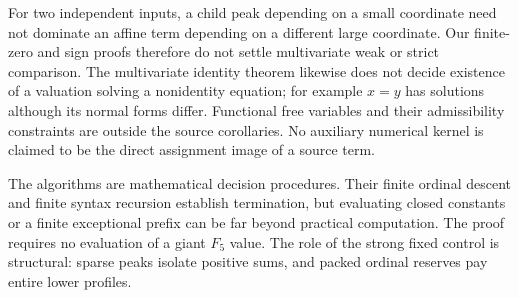 \documentclass[11pt,a4paper]{article}
\begin{document}
For two independent inputs, a child peak depending on a small coordinate
need not dominate an affine term depending on a different large coordinate.
Our finite-zero and sign proofs therefore do not settle multivariate
weak or strict comparison. The multivariate identity theorem likewise
does not decide existence of a valuation solving a nonidentity equation;
for example $x=y$ has solutions although its normal forms differ.
Functional free variables and their admissibility constraints are outside
the source corollaries. No auxiliary numerical kernel is claimed to be
the direct assignment image of a source term.

The algorithms are mathematical decision procedures. Their finite ordinal
descent and finite syntax recursion establish termination, but evaluating
closed constants or a finite exceptional prefix can be far beyond practical
computation. The proof requires no evaluation of a giant $F_5$ value.
The role of the strong fixed control is structural: sparse peaks isolate
positive sums, and packed ordinal reserves pay entire lower profiles.


\end{document}
